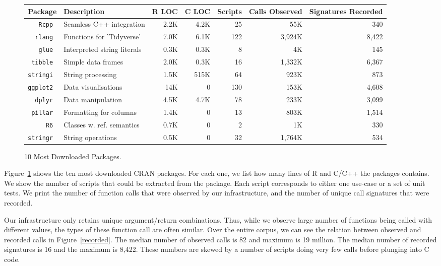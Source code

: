 \documentclass[acmsmall,10pt,review,anonymous]{acmart}\settopmatter{printfolios=true,printccs=false,printacmref=false}
\begin{document}
\begin{figure}[!th]{\footnotesize\begin{tabular}{@{}r||l|r|r|r|r|r@{}}\hline
\bf Package & \bf Description & \bf R LOC &\bf C LOC &\bf Scripts & \bf Calls Observed & \bf Signatures Recorded \\
\hline
\tt Rcpp  & Seamless C++ integration & 2.2K & 4.2K & 25 & 55K & 340 \\
\tt rlang & Functions for 'Tidyverse' & 7.0K & 6.1K & 122 & 3,924K & 8,422 \\
\tt glue  & Interpreted string literals & 0.3K & 0.3K & 8 & 4K & 145 \\
\tt tibble & Simple data frames & 2.0K & 0.3K & 16 & 1,332K & 6,367 \\
\tt stringi &  String processing & 1.5K & 515K & 64 & 923K & 873 \\
\tt ggplot2 & Data visualisations & 14K & 0 & 130 & 153K & 4,608 \\
\tt dplyr  &  Data manipulation & 4.5K & 4.7K & 78 & 233K & 3,099 \\
\tt pillar & Formatting for columns & 1.4K & 0 & 13 & 803K & 1,514 \\
\tt R6 & Classes w. ref. semantics & 0.7K & 0 & 2 & 1K & 330 \\
\tt stringr & String operations & 0.5K & 0 & 32 & 1,764K & 534 \\
\end{tabular}}\caption{10 Most Downloaded Packages.}\label{most}
\end{figure}

Figure~\ref{most} shows the ten most downloaded CRAN packages.  For each
one, we list how many lines of R and C/C++ the packages contains.  We show
the number of scripts that could be extracted from the package. Each script
corresponds to either one use-case or a set of unit tests. We print the
number of function calls that were observed by our infrastructure, and the
number of unique call signatures that were recorded. 

Our infrastructure only retains unique argument/return combinations. Thus,
while we observe large number of functions being called with different
values, the types of these function call are often similar. Over the entire
corpus, we can see the relation between observed and recorded calls in
Figure~\ref{recorded}.  The median number of observed calls is 82 and
maximum is 19 million.  The median number of recorded signatures is 16 and
the maximum is 8,422. These numbers are skewed by a number of scripts doing
very few calls before plunging into C code.
\end{document}
